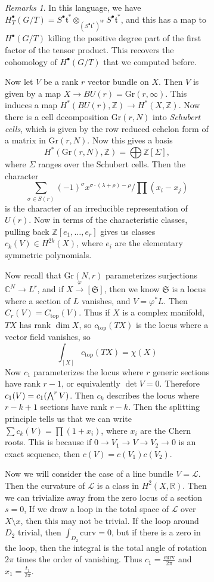 \documentclass[leqno, openany]{memoir}
\theoremstyle{definition}
\theoremstyle{remark}
\newtheorem{rmks}[thm]{Remarks}
\theoremstyle{plain}
\theoremstyle{definition}
\theoremstyle{remark}
\newcommand{\R}{\mathbb{R}}
\newcommand{\C}{\mathbb{C}}
\newcommand{\Z}{\mathbb{Z}}
\newcommand{\mc}[1]{\mathcal{#1}}
\newcommand{\mf}[1]{\mathfrak{#1}}
\newcommand{\mr}[1]{\mathrm{#1}}
\begin{document}
\begin{figure}[H]
\begin{figure}[H]
\begin{rmks}
    In this language, we have $H_T^{\bullet}(G/T) = S^{\bullet} \mf{t}^*
\otimes_{{(S^{\bullet} \mf{t}^*)}^W} S^{\bullet} \mf{t}^*$, and this has a map
to $H^{\bullet}(G/T)$ killing the positive degree part of the first factor of
the tensor product. This recovers the cohomology of $H^{\bullet}(G/T)$ that we
computed before.  \end{rmks}

Now let $V$ be a rank $r$ vector bundle on $X$. Then $V$ is given by a map $X
\to BU(r) = \mr{Gr}(r, \infty)$. This induces a map $H^*(BU(r), \Z) \to H^*(X,
\Z)$. Now there is a cell decomposition $\mr{Gr}(r, N)$ into \textit{Schubert
cells}, which is given by the row reduced echelon form of a matrix in
$\mr{Gr}(r, N)$. Now this gives a basis \[ H^*(\mr{Gr}(r, N), \Z) = \bigoplus
\Z[\Sigma], \] where $\Sigma$ ranges over the Schubert cells. Then the
character \[ \sum_{\sigma \in S(r)} {(-1)}^{\sigma} x^{\sigma \cdot (\lambda +
\rho) - \rho} / \prod (x_i - x_j) \] is the character of an irreducible
representation of $U(r)$. Now in terms of the characteristic classes, pulling
back $\Z[e_1, \ldots, e_r]$ gives us classes $c_k(V) \in H^{2k}(X)$, where
$e_i$ are the elementary symmetric polynomials.

Now recall that $\mr{Gr}(N, r)$ parameterizes surjections $\C^N \to L^r$, and
if $X \xrightarrow{\varphi} [\mathfrak{S}]$, then we know $\mf{S}$ is a locus
where a section of $L$ vanishes, and $V = \varphi^* L$. Then $C_r(V) =
C_{\mr{top}}(V)$. Thus if $X$ is a complex manifold, $TX$ has rank $\dim X$, so
$c_{\mr{top}}(TX)$ is the locus where a vector field vanishes, so \[ \int_{[X]}
c_{\mr{top}}(TX) = \chi(X) \] Now $c_1$ parameterizes the locus where $r$
generic sections have rank $r-1$, or equivalently $\det V = 0$. Therefore
$c_1(V) = c_1 \qty(\bigwedge^r V)$. Then $c_k$ describes the locus where
$r-k+1$ sections have rank $r-k$. Then the splitting principle tells us that we
can write $\sum c_k(V) = \prod (1 + x_i)$, where $x_i$ are the Chern roots.
This is because if $0 \to V_1 \to V \to V_2 \to 0$ is an exact sequence, then
$c(V) = c(V_1) c(V_2)$.

Now we will consider the case of a line bundle $V = \mc{L}$. Then the curvature
of $\mc{L}$ is a class in $H^2(X, \R)$. Then we can trivialize away from the
zero locus of a section $s = 0$, If we draw a loop in the total space of
$\mc{L}$ over $X \setminus x$, then this may not be trivial. If the loop around
$D_2$ trivial, then $\int_{D_2} \mr{curv} = 0$, but if there is a zero in the
loop, then the integral is the total angle of rotation $2 \pi$ times the order
of vanishing. Thus $c_1 = \frac{\mr{curv}}{2\pi}$ and $x_1 = \frac{t_1}{2\pi}$.


\end{figure}
\end{figure}
\end{document}
